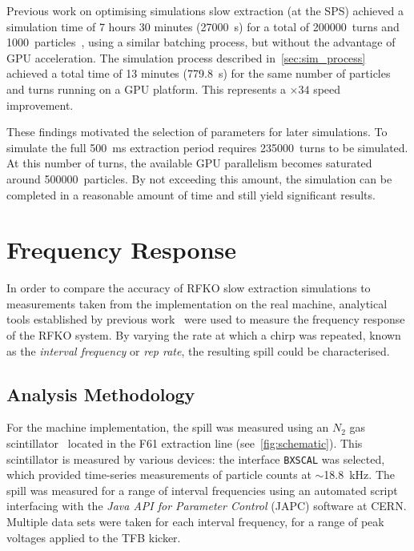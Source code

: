 \documentclass[a4paper,twoside,11pt]{report}
\begin{document}
Previous work on optimising simulations slow extraction (at the SPS) achieved a simulation time of 7 hours 30 minutes (\qty{27000}{\second}) for a total of \qty{200000}{turns} and \qty{1000}{particles}~\cite[Figure 3]{Schicho:2039579}, using a similar batching process, but without the advantage of GPU acceleration. The simulation process described in~\autoref{sec:sim_process} achieved a total time of 13 minutes (\qty{779.8}{\second}) for the same number of particles and turns running on a GPU platform. This represents a $\times 34$ speed improvement.

These findings motivated the selection of parameters for later simulations. To simulate the full \qty{500}{\milli\second} extraction period requires \qty{235000}{turns} to be simulated. At this number of turns, the available GPU parallelism becomes saturated around \qty{500000}{particles}. By not exceeding this amount, the simulation can be completed in a reasonable amount of time and still yield significant results.

\clearpage
\section{Frequency Response}\label{results:freq_response}

In order to compare the accuracy of RFKO slow extraction simulations to measurements taken from the implementation on the real machine, analytical tools established by previous work~\cite{Pari:2780495} were used to measure the frequency response of the RFKO system. By varying the rate at which a chirp was repeated, known as the \textit{interval frequency} or \textit{rep rate}, the resulting spill could be characterised. 

\subsection{Analysis Methodology}\label{sec:machine_freq_anal_method}

For the machine implementation, the spill was measured using an $N_2$ gas scintillator~\cite{Actis:bxscint} located in the F61 extraction line (see~\autoref{fig:schematic}). This scintillator is measured by various devices: the interface \verb|BXSCAL| was selected, which provided time-series measurements of particle counts at $\sim$\qty{18.8}{\kilo\hertz}. The spill was measured for a range of interval frequencies using an automated script interfacing with the \textit{Java API for Parameter Control} (JAPC) software at CERN. Multiple data sets were taken for each interval frequency, for a range of peak voltages applied to the TFB kicker. 
\end{document}
